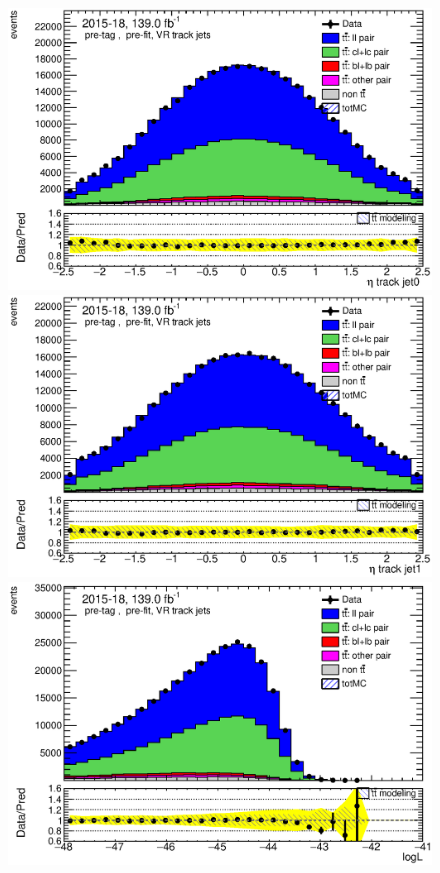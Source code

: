 \documentclass[letterpaper,12pt]{article}
\begin{document}
	\newpage	
	\begin{figure}[H]
	\begin{minipage}[b]{.45\textwidth}
	\centering
	\includegraphics[width=1\textwidth]{Oct_distributions/pretagNoRwDL1rwithhighpTVRJets_scaledall/DataMC_J0_eta.eps}
	\end{minipage}\hfill
	\begin{minipage}[b]{.45\textwidth}
	\centering
	\includegraphics[width=1\textwidth]{Oct_distributions/pretagNoRwDL1rwithhighpTVRJets_scaledall/DataMC_J1_eta.eps}
	\end{minipage}\hfill
	\begin{minipage}[b]{.45\textwidth}
	\centering
	\includegraphics[width=1\textwidth]{Oct_distributions/pretagNoRwDL1rwithhighpTVRJets_scaledall/DataMC_LLR.eps}

\end{minipage}
\end{figure}
\end{document}
